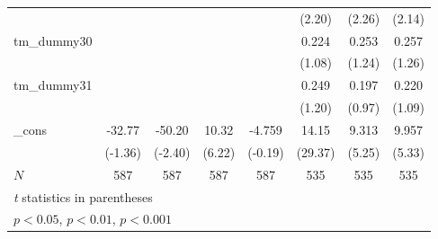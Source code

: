 {\begin{tabular}{l*{7}{c}}
            &                     &                     &                     &                     &      (2.20)         &      (2.26)         &      (2.14)         \\
[1em]
tm\_dummy30  &                     &                     &                     &                     &       0.224         &       0.253         &       0.257         \\
            &                     &                     &                     &                     &      (1.08)         &      (1.24)         &      (1.26)         \\
[1em]
tm\_dummy31  &                     &                     &                     &                     &       0.249         &       0.197         &       0.220         \\
            &                     &                     &                     &                     &      (1.20)         &      (0.97)         &      (1.09)         \\
[1em]
\_cons      &      -32.77         &      -50.20\sym{*}  &       10.32\sym{***}&      -4.759         &       14.15\sym{***}&       9.313\sym{***}&       9.957\sym{***}\\
            &     (-1.36)         &     (-2.40)         &      (6.22)         &     (-0.19)         &     (29.37)         &      (5.25)         &      (5.33)         \\
\hline
\(N\)       &         587         &         587         &         587         &         587         &         535         &         535         &         535         \\
\hline\hline
\multicolumn{8}{l}{\footnotesize \textit{t} statistics in parentheses}\\
\multicolumn{8}{l}{\footnotesize \sym{*} \(p<0.05\), \sym{**} \(p<0.01\), \sym{***} \(p<0.001\)}\\
\end{tabular}
}
